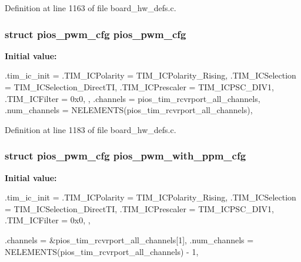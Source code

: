\-Definition at line 1163 of file board\-\_\-hw\-\_\-defs.\-c.

\hypertarget{group___copter_control_ga7587f8e174df90bef8cec1edfa9e14c1}{
\subsubsection[{pios\-\_\-pwm\-\_\-cfg}]{\setlength{\rightskip}{0pt plus 5cm}struct {\bf pios\-\_\-pwm\-\_\-cfg} {\bf pios\-\_\-pwm\-\_\-cfg}}}\label{group___copter_control_ga7587f8e174df90bef8cec1edfa9e14c1}
{\bfseries \-Initial value\-:}
\begin{DoxyCode}
 {
        .tim_ic_init = {
                .TIM_ICPolarity = TIM_ICPolarity_Rising,
                .TIM_ICSelection = TIM_ICSelection_DirectTI,
                .TIM_ICPrescaler = TIM_ICPSC_DIV1,
                .TIM_ICFilter = 0x0,
        },
        .channels = pios_tim_rcvrport_all_channels,
        .num_channels = NELEMENTS(pios_tim_rcvrport_all_channels),
}
\end{DoxyCode}


\-Definition at line 1183 of file board\-\_\-hw\-\_\-defs.\-c.

\hypertarget{group___copter_control_ga6a7a8338c617f18384f3b3c5678f5505}{
\subsubsection[{pios\-\_\-pwm\-\_\-with\-\_\-ppm\-\_\-cfg}]{\setlength{\rightskip}{0pt plus 5cm}struct {\bf pios\-\_\-pwm\-\_\-cfg} {\bf pios\-\_\-pwm\-\_\-with\-\_\-ppm\-\_\-cfg}}}\label{group___copter_control_ga6a7a8338c617f18384f3b3c5678f5505}
{\bfseries \-Initial value\-:}
\begin{DoxyCode}
 {
        .tim_ic_init = {
                .TIM_ICPolarity = TIM_ICPolarity_Rising,
                .TIM_ICSelection = TIM_ICSelection_DirectTI,
                .TIM_ICPrescaler = TIM_ICPSC_DIV1,
                .TIM_ICFilter = 0x0,
        },
        
        .channels = &pios_tim_rcvrport_all_channels[1],
        .num_channels = NELEMENTS(pios_tim_rcvrport_all_channels) - 1,
}
\end{DoxyCode}


